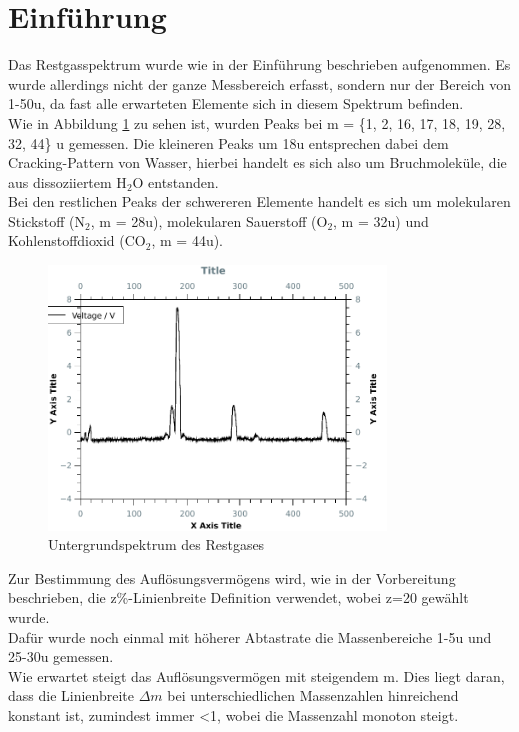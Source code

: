 \section{Einführung}

Das Restgasspektrum wurde wie in der Einführung beschrieben aufgenommen. Es wurde allerdings nicht der ganze Messbereich erfasst, sondern nur der Bereich von 1-50\;u, da fast alle erwarteten Elemente sich in diesem Spektrum befinden.\\
Wie in Abbildung \ref{fig:untergrund_1} zu sehen ist, wurden Peaks bei m = \{1, 2, 16, 17, 18, 19, 28, 32, 44\} u gemessen. Die kleineren Peaks um 18\;u entsprechen dabei dem Cracking-Pattern von Wasser, hierbei handelt es sich also um Bruchmoleküle, die aus dissoziiertem
H$_2$O entstanden.\\
Bei den restlichen Peaks der schwereren Elemente handelt es sich um molekularen Stickstoff (N$_2$, m = 28\;u), molekularen Sauerstoff (O$_2$, m = 32\;u) und Kohlenstoffdioxid (CO$_2$, m = 44\;u).\\

\begin{figure}[h]
	\centering\includegraphics[width=0.8\textwidth]{fig/untergrund_1}
	\caption{Untergrundspektrum des Restgases}
	\label{fig:untergrund_1}
\end{figure}

Zur Bestimmung des Auflösungsvermögens wird, wie in der Vorbereitung beschrieben, die z\%-Linienbreite Definition verwendet, wobei z=20 gewählt wurde.\\
Dafür wurde noch einmal mit höherer Abtastrate die Massenbereiche 1-5\;u und 25-30\;u gemessen.\\
Wie erwartet steigt das Auflösungsvermögen mit steigendem m. Dies liegt daran, dass die Linienbreite $\Delta m$ bei unterschiedlichen Massenzahlen hinreichend konstant ist, zumindest immer <1, wobei die Massenzahl monoton steigt.\\

